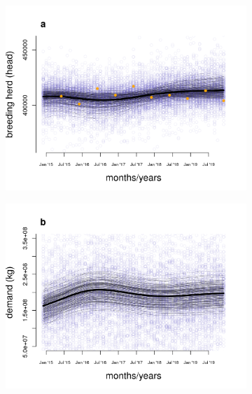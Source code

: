 \documentclass[9pt,twocolumn,twoside,lineno]{pnas-new}
\begin{document}
\begin{figure}[t!]
  \begin{subfigure}{0.5\textwidth}
   \centering
    \includegraphics[scale=0.4]{figure_3a.png}%
  \end{subfigure}%
  \begin{subfigure}{0.5\textwidth}
   \centering
    \includegraphics[scale=0.4]{figure_3b.png}
  \end{subfigure}


\end{figure}
\end{document}
